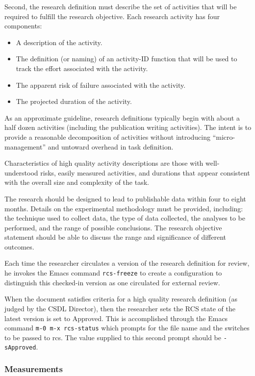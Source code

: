 Second, the research definition must describe the set of activities that
will be required to fulfill the research objective.
Each research activity has four  components:
\begin{itemize}
\item A description of the activity.
\item The definition (or naming) of an activity-ID function that will be
used to track the effort associated with the activity.
\item The apparent risk of failure associated with the activity.
\item The projected duration of the activity.
\end{itemize}

As an approximate guideline, research definitions typically begin with
about a half dozen activities (including the publication writing
activities).  The intent is to provide a reasonable decomposition of
activities without introducing ``micro-management'' and untoward overhead
in task definition.

Characteristics of high quality activity descriptions are those with
well-understood risks, easily measured activities, and durations that
appear consistent with the overall size and complexity of the task.

The research should be designed to lead to publishable data within four
to eight months.  Details on the experimental methodology must be provided,
including: the technique used to collect data, the type of data collected,
the analyses to be performed, and the range of possible conclusions.  The
research objective statement should be able to discuss the range and
significance of different outcomes.

Each time the researcher circulates a version of the research definition
for review, he invokes the Emacs command {\tt rcs-freeze} to create a
configuration to distinguish this checked-in version as one circulated for
external review.

When the document satisfies criteria for a high quality research definition
(as judged by the CSDL Director), then the researcher sets the RCS state of
the latest version is set to Approved.  This is accomplished through the
Emacs command {\tt m-0 m-x rcs-status} which prompts for the file name and
the switches to be passed to rcs.  The value supplied to this second prompt
should be {\tt -sApproved}.


\subsubsection*{Measurements}


